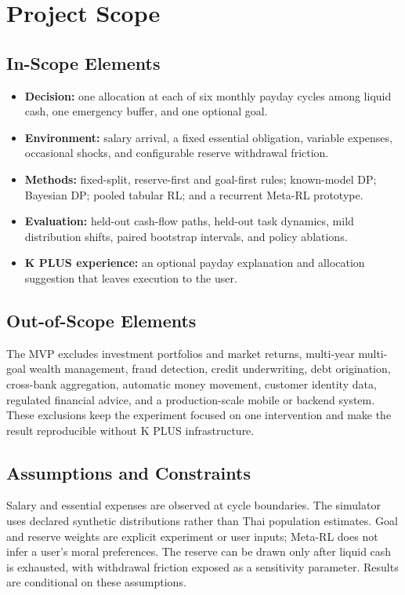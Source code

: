 \section{Project Scope}\label{sec:project_scope}

\subsection{In-Scope Elements}
\begin{itemize}[noitemsep,topsep=2pt]
    \item \textbf{Decision:} one allocation at each of six monthly payday cycles among liquid cash, one emergency buffer, and one optional goal.
    \item \textbf{Environment:} salary arrival, a fixed essential obligation, variable expenses, occasional shocks, and configurable reserve withdrawal friction.
    \item \textbf{Methods:} fixed-split, reserve-first and goal-first rules; known-model DP; Bayesian DP; pooled tabular RL; and a recurrent Meta-RL prototype.
    \item \textbf{Evaluation:} held-out cash-flow paths, held-out task dynamics, mild distribution shifts, paired bootstrap intervals, and policy ablations.
    \item \textbf{K PLUS experience:} an optional payday explanation and allocation suggestion that leaves execution to the user.
\end{itemize}

\subsection{Out-of-Scope Elements}
The MVP excludes investment portfolios and market returns, multi-year multi-goal wealth management, fraud detection, credit underwriting, debt origination, cross-bank aggregation, automatic money movement, customer identity data, regulated financial advice, and a production-scale mobile or backend system. These exclusions keep the experiment focused on one intervention and make the result reproducible without K PLUS infrastructure.

\subsection{Assumptions and Constraints}
Salary and essential expenses are observed at cycle boundaries. The simulator uses declared synthetic distributions rather than Thai population estimates. Goal and reserve weights are explicit experiment or user inputs; Meta-RL does not infer a user's moral preferences. The reserve can be drawn only after liquid cash is exhausted, with withdrawal friction exposed as a sensitivity parameter. Results are conditional on these assumptions.

